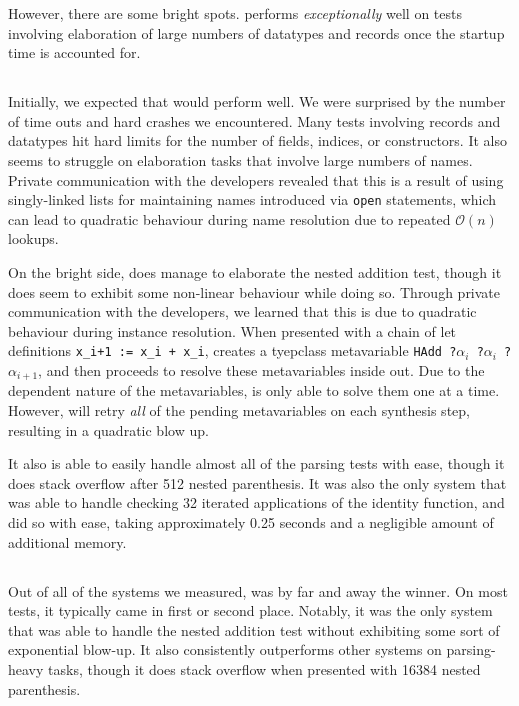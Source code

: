 \documentclass[a4paper,UKenglish,cleveref, autoref, thm-restate,anonymous]{lipics-v2021}
\begin{document}
However, there are some bright spots. \idris performs \emph{exceptionally} well on tests
involving elaboration of large numbers of datatypes and records once the startup time is accounted for.

\subsection{\lean}

Initially, we expected that \lean would perform well.
We were surprised by the number of time outs and hard crashes
we encountered. Many tests involving records and datatypes hit hard limits
for the number of fields, indices, or constructors. It also seems to struggle
on elaboration tasks that involve large numbers of names. Private communication
with the developers revealed that this is a result of using singly-linked lists
for maintaining names introduced via \texttt{open} statements, which can lead
to quadratic behaviour during name resolution due to repeated \(\mathcal{O}(n)\)
lookups.

On the bright side, \lean does manage to elaborate the nested addition test,
though it does seem to exhibit some non-linear behaviour while doing so. Through
private communication with the \lean developers, we learned that this is due to
quadratic behaviour during instance resolution. When presented with a
chain of let definitions \texttt{x_{i+1} := x_{i} + x_{i}}, \lean creates a
tyepclass metavariable \texttt{HAdd ?\(\alpha_{i}\) ?\(\alpha_{i}\) ?\(\alpha_{i+1}\)}, and then
proceeds to resolve these metavariables inside out. Due to the dependent nature of the
metavariables, \lean is only able to solve them one at a time. However, \lean will retry
\emph{all} of the pending metavariables on each synthesis step, resulting in a quadratic
blow up.

It also is able to easily handle almost all of the parsing tests with ease,
though it does stack overflow after 512 nested parenthesis. It was also the
only system that was able to handle checking 32 iterated applications of the
identity function, and did so with ease, taking approximately 0.25 seconds and
a negligible amount of additional memory.

\subsection{\rocq}

Out of all of the systems we measured, \rocq was by far and away the winner.
On most tests, it typically came in first or second place. Notably, it
was the only system that was able to handle the nested addition test without
exhibiting some sort of exponential blow-up. It also consistently outperforms
other systems on parsing-heavy tasks, though it does stack overflow when
presented with 16384 nested parenthesis.
\end{document}
